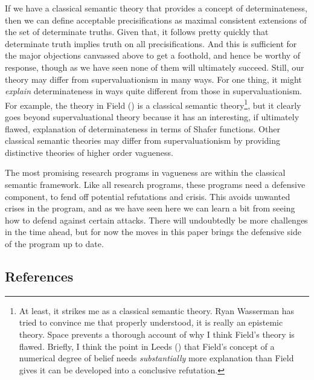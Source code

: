\documentclass[
  10pt,
  letterpaper,
  DIV=11,
  numbers=noendperiod,
  twoside]{scrartcl}
\begin{document}
If we have a classical semantic theory that provides a concept of
determinateness, then we can define acceptable precisifications as
maximal consistent extensions of the set of determinate truths. Given
that, it follows pretty quickly that determinate truth implies truth on
all precisifications. And this is sufficient for the major objections
canvassed above to get a foothold, and hence be worthy of response,
though as we have seen none of them will ultimately succeed. Still, our
theory may differ from supervaluationism in many ways. For one thing, it
might \emph{explain} determinateness in ways quite different from those
in supervaluationism. For example, the theory in Field
() is a classical semantic
theory\footnote{At least, it strikes me as a classical semantic theory.
  Ryan Wasserman has tried to convince me that properly understood, it
  is really an epistemic theory. Space prevents a thorough account of
  why I think Field's theory is flawed. Briefly, I think the point in
  Leeds () that Field's concept of a
  numerical degree of belief needs \emph{substantially} more explanation
  than Field gives it can be developed into a conclusive refutation.},
but it clearly goes beyond supervaluational theory because it has an
interesting, if ultimately flawed, explanation of determinateness in
terms of Shafer functions. Other classical semantic theories may differ
from supervaluationism by providing distinctive theories of higher order
vagueness.

The most promising research programs in vagueness are within the
classical semantic framework. Like all research programs, these programs
need a defensive component, to fend off potential refutations and
crisis. This avoids unwanted crises in the program, and as we have seen
here we can learn a bit from seeing how to defend against certain
attacks. There will undoubtedly be more challenges in the time ahead,
but for now the moves in this paper brings the defensive side of the
program up to date.

\subsection*{References}\label{references}
\end{document}
